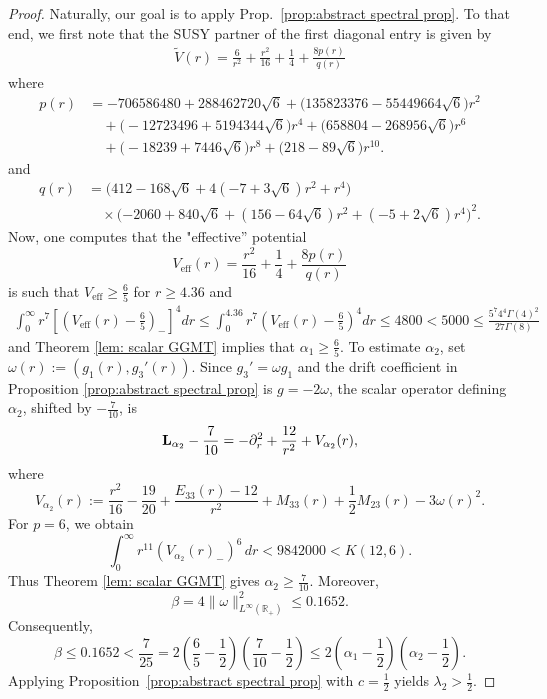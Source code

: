 \documentclass[11pt,reqno]{amsart}
\theoremstyle{remark}
\newcommand{\Lf}{\textup{\textbf{L}}}
\theoremstyle{definition}
\begin{document}
\begin{proof}
    Naturally, our goal is to apply Prop.~\ref{prop:abstract spectral prop}. To that end, we first note that the SUSY partner of the first diagonal entry is given by
    \begin{align*}
    \tilde{V}(r)= \frac{6}{r^2}+\frac{r^2}{16}+\frac{1}{4}+\frac{8p(r)}{q(r)}
    \end{align*}
    where
\begin{align*}
p(r)&=
-706586480+288462720\sqrt6
+\bigl(135823376-55449664\sqrt6\bigr)r^2
\\
&\quad
+\bigl(-12723496+5194344\sqrt6\bigr)r^4
+\bigl(658804-268956\sqrt6\bigr)r^6
\\
& \quad
+\bigl(-18239+7446\sqrt6\bigr)r^8
+\bigl(218-89\sqrt6\bigr)r^{10}.
\end{align*}
    and
    \begin{align*}
    q(r)&=\bigl(412-168\sqrt6+4(-7+3\sqrt6)r^2+r^4\bigr)
    \\
    &\quad \times (-2060+840\sqrt6 +(156-64\sqrt6)r^2 +(-5+2\sqrt6)r^4\bigr)^2.
    \end{align*}
    Now, one computes that the "effective'' potential 
    $$
    V_{\text{eff}}(r)=\frac{r^2}{16}+\frac{1}{4}+\frac{8p(r)}{q(r)}
    $$
    is such that $ V_{\text{eff}}\geq \frac65$  for $r\geq 4.36$ and 
    \begin{align*}
    \int_0^\infty r^7\left[(V_{\text{eff}}(r)-\frac65)_{-}\right]^4 dr \leq   \int_0^{4.36} r^7(V_{\text{eff}}(r)-\frac65)^4 dr \leq 4800<  5000\leq  \frac{5^{7} 4^4 \Gamma(4)^2}{27 \Gamma(8)}
    \end{align*}
    and Theorem \ref{lem: scalar GGMT} implies that $\alpha_1\geq \frac65$. To estimate $\alpha_2$, set $\omega(r):=(g_1(r),g_3'(r))$.
Since $g_3'=\omega g_1$ and the drift coefficient in
Proposition \ref{prop:abstract spectral prop} is $g=-2\omega$,
the scalar operator defining $\alpha_2$, shifted by $-\frac7{10}$,
is
\[
\Lf_{\alpha_2}-\frac7{10}
=-\partial_r^2+\frac{12}{r^2}+V_{\alpha_2}(r),
\]
where
\[
V_{\alpha_2}(r):=\frac{r^2}{16}-\frac{19}{20}
      +\frac{E_{33}(r)-12}{r^2}
      +M_{33}(r)+\frac12 M_{23}(r)-3\omega(r)^2.
\]
For $p=6$, we obtain
\[
\int_0^\infty r^{11}\left(V_{\alpha_2}(r)_-\right)^6\,dr
<9842000
<K(12,6).
\]
Thus Theorem \ref{lem: scalar GGMT} gives
$\alpha_2\geq\frac7{10}$. Moreover,
\[
\beta=4\|\omega\|_{L^\infty(\mathbb R_+)}^2\leq0.1652.
\]
Consequently,
\[
\beta\leq0.1652
<\frac7{25}
=2\left(\frac65-\frac12\right)
  \left(\frac7{10}-\frac12\right)
\leq2\left(\alpha_1-\frac12\right)
     \left(\alpha_2-\frac12\right).
\]
Applying Proposition~\ref{prop:abstract spectral prop}
with $c=\frac12$ yields $\lambda_2>\frac12$.
\end{proof}
\end{document}
